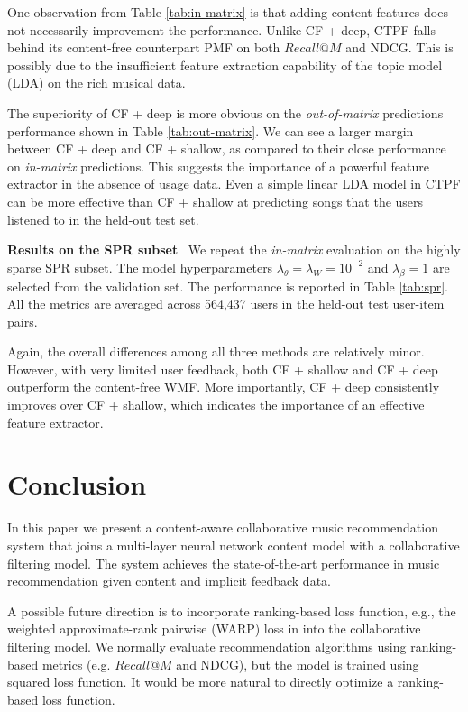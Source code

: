 One observation from Table \ref{tab:in-matrix} is that adding content features does not necessarily improvement the performance. Unlike CF + deep, CTPF falls behind its content-free counterpart PMF on both $Recall@M$ and NDCG. This is possibly due to the insufficient feature extraction capability of the topic model (LDA) on the rich musical data. 

The superiority of CF + deep is more obvious on the \emph{out-of-matrix} predictions performance shown in Table \ref{tab:out-matrix}. We can see a larger margin between CF + deep and CF + shallow, as compared to their close performance on \emph{in-matrix} predictions. This suggests the importance of a powerful feature extractor in the absence of usage data. Even a simple linear LDA model in CTPF can be more effective than CF + shallow at predicting songs that the users listened to in the held-out test set. %

\vspace{0.1in}
\noindent\textbf{Results on the {SPR} subset}~
We repeat the \emph{in-matrix} evaluation on the highly sparse SPR subset. The model hyperparameters $\lambda_\theta = \lambda_W = 10^{-2}$ and $\lambda_\beta = 1$ are selected from the validation set. The performance is reported in Table \ref{tab:spr}. All the metrics are averaged across 564,437 users in the held-out test user-item pairs.

Again, the overall differences among all three methods are relatively minor. However, with very limited user feedback, both CF + shallow and CF + deep outperform the content-free WMF. More importantly, CF + deep consistently improves over CF + shallow, which indicates the importance of an effective feature extractor.  


\section{Conclusion}
In this paper we present a content-aware collaborative music recommendation system that joins a multi-layer neural network content model with a collaborative filtering model. The system achieves the state-of-the-art performance in music recommendation given content and implicit feedback data. 


A possible future direction is to incorporate ranking-based loss function, e.g., the weighted approximate-rank pairwise (WARP) loss in \cite{37180} into the collaborative filtering model. We normally evaluate recommendation algorithms using ranking-based metrics (e.g. $Recall@M$ and NDCG), but the model is trained using squared loss function. It would be more natural to directly optimize a ranking-based loss function.  
